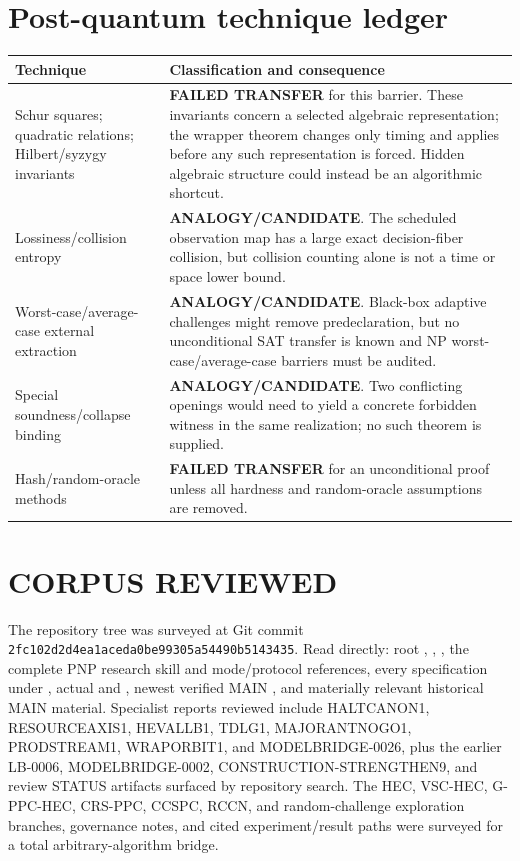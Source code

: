 \documentclass[11pt]{article}
\begin{document}
\section{Post-quantum technique ledger}

\begin{longtable}{p{.30\linewidth}p{.62\linewidth}}
\toprule
Technique & Classification and consequence \\
\midrule
Schur squares; quadratic relations; Hilbert/syzygy invariants & \textbf{FAILED TRANSFER}
for this barrier.  These invariants concern a selected algebraic representation; the
wrapper theorem changes only timing and applies before any such representation is forced.
Hidden algebraic structure could instead be an algorithmic shortcut. \\
Lossiness/collision entropy & \textbf{ANALOGY/CANDIDATE}.  The scheduled observation map
has a large exact decision-fiber collision, but collision counting alone is not a time or
space lower bound. \\
Worst-case/average-case external extraction & \textbf{ANALOGY/CANDIDATE}.  Black-box
adaptive challenges might remove predeclaration, but no unconditional SAT transfer is
known and NP worst-case/average-case barriers must be audited. \\
Special soundness/collapse binding & \textbf{ANALOGY/CANDIDATE}.  Two conflicting
openings would need to yield a concrete forbidden witness in the same realization; no
such theorem is supplied. \\
Hash/random-oracle methods & \textbf{FAILED TRANSFER} for an unconditional proof unless
all hardness and random-oracle assumptions are removed. \\
\bottomrule
\end{longtable}

\section{CORPUS REVIEWED}

The repository tree was surveyed at Git commit
\texttt{2fc102d2d4ea1aceda0be99305a54490b5143435}.  Read directly: root
, , , the complete PNP research skill and
mode/protocol references, every specification under , actual
 and , newest verified MAIN
, and materially relevant
historical MAIN material.  Specialist reports reviewed include HALTCANON1,
RESOURCEAXIS1, HEVALLB1, TDLG1, MAJORANTNOGO1, PRODSTREAM1, WRAPORBIT1, and
MODELBRIDGE-0026, plus the earlier LB-0006, MODELBRIDGE-0002,
CONSTRUCTION-STRENGTHEN9, and review STATUS artifacts surfaced by repository search.
The HEC, VSC-HEC, G-PPC-HEC, CRS-PPC, CCSPC, RCCN, and random-challenge exploration
branches, governance notes, and cited experiment/result paths were surveyed for a total
arbitrary-algorithm bridge.
\end{document}
